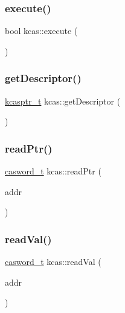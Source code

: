 \mbox{\label{namespacekcas_ae51aac13e4c5df1190241ae51968387a}} 
\subsubsection{\texorpdfstring{execute()}{execute()}}
{\footnotesize\ttfamily bool kcas\+::execute (\begin{DoxyParamCaption}{ }\end{DoxyParamCaption})}

\mbox{\label{namespacekcas_aa3f3e7af6facd9b5108b3b3fe8e4ed82}} 
\subsubsection{\texorpdfstring{get\+Descriptor()}{getDescriptor()}}
{\footnotesize\ttfamily \hyperlink{kcas__reuse__impl_8h_a5bbc81d391bfd6b4288a0d33f105a0b2}{kcasptr\+\_\+t} kcas\+::get\+Descriptor (\begin{DoxyParamCaption}{ }\end{DoxyParamCaption})}

\mbox{\label{namespacekcas_a1f34f966b2243f133f1d936ec1761578}} 
\subsubsection{\texorpdfstring{read\+Ptr()}{readPtr()}}
{\footnotesize\ttfamily \hyperlink{rq__unsafe_8h_ad45142aaf2ff20a036dc6242b8483e9c}{casword\+\_\+t} kcas\+::read\+Ptr (\begin{DoxyParamCaption}\item[{\hyperlink{rq__unsafe_8h_ad45142aaf2ff20a036dc6242b8483e9c}{casword\+\_\+t} volatile $\ast$}]{addr }\end{DoxyParamCaption})}

\mbox{\label{namespacekcas_a41e805427c946f9e77ae065c624b2399}} 
\subsubsection{\texorpdfstring{read\+Val()}{readVal()}}
{\footnotesize\ttfamily \hyperlink{rq__unsafe_8h_ad45142aaf2ff20a036dc6242b8483e9c}{casword\+\_\+t} kcas\+::read\+Val (\begin{DoxyParamCaption}\item[{\hyperlink{rq__unsafe_8h_ad45142aaf2ff20a036dc6242b8483e9c}{casword\+\_\+t} volatile $\ast$}]{addr }\end{DoxyParamCaption})}

